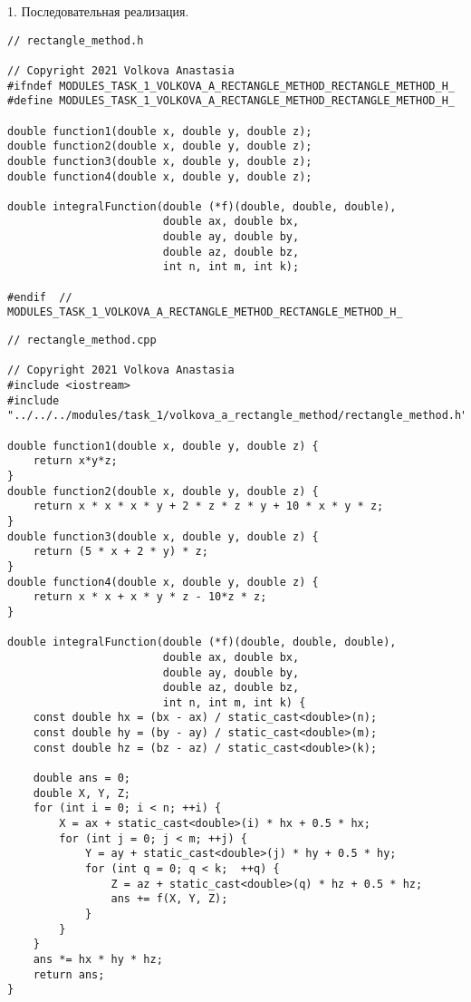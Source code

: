 \documentclass{report}
\begin{document}
\par 1. Последовательная реализация.
\begin{lstlisting}
// rectangle_method.h

// Copyright 2021 Volkova Anastasia
#ifndef MODULES_TASK_1_VOLKOVA_A_RECTANGLE_METHOD_RECTANGLE_METHOD_H_
#define MODULES_TASK_1_VOLKOVA_A_RECTANGLE_METHOD_RECTANGLE_METHOD_H_

double function1(double x, double y, double z);
double function2(double x, double y, double z);
double function3(double x, double y, double z);
double function4(double x, double y, double z);

double integralFunction(double (*f)(double, double, double),
                        double ax, double bx,
                        double ay, double by,
                        double az, double bz,
                        int n, int m, int k);

#endif  // MODULES_TASK_1_VOLKOVA_A_RECTANGLE_METHOD_RECTANGLE_METHOD_H_

\end{lstlisting}
\begin{lstlisting}
// rectangle_method.cpp

// Copyright 2021 Volkova Anastasia
#include <iostream>
#include "../../../modules/task_1/volkova_a_rectangle_method/rectangle_method.h"

double function1(double x, double y, double z) {
    return x*y*z;
}
double function2(double x, double y, double z) {
    return x * x * x * y + 2 * z * z * y + 10 * x * y * z;
}
double function3(double x, double y, double z) {
    return (5 * x + 2 * y) * z;
}
double function4(double x, double y, double z) {
    return x * x + x * y * z - 10*z * z;
}

double integralFunction(double (*f)(double, double, double),
                        double ax, double bx,
                        double ay, double by,
                        double az, double bz,
                        int n, int m, int k) {
    const double hx = (bx - ax) / static_cast<double>(n);
    const double hy = (by - ay) / static_cast<double>(m);
    const double hz = (bz - az) / static_cast<double>(k);

    double ans = 0;
    double X, Y, Z;
    for (int i = 0; i < n; ++i) {
        X = ax + static_cast<double>(i) * hx + 0.5 * hx;
        for (int j = 0; j < m; ++j) {
            Y = ay + static_cast<double>(j) * hy + 0.5 * hy;
            for (int q = 0; q < k;  ++q) {
                Z = az + static_cast<double>(q) * hz + 0.5 * hz;
                ans += f(X, Y, Z);
            }
        }
    }
    ans *= hx * hy * hz;
    return ans;
}

\end{lstlisting}
\end{document}
